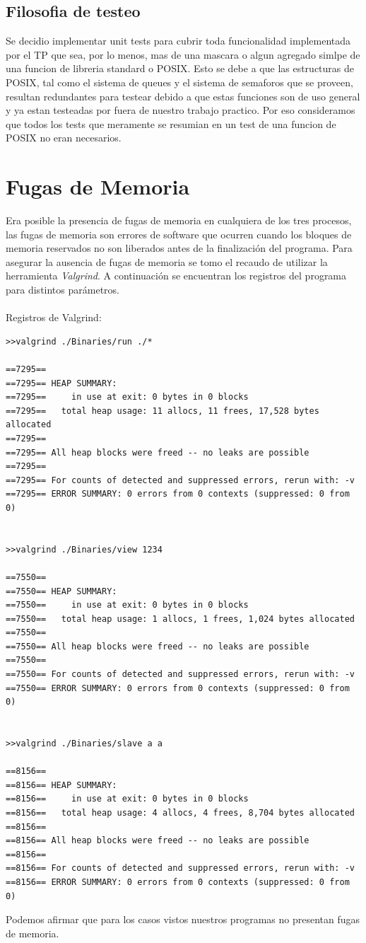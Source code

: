\documentclass[10pt,a4paper]{report}
\begin{document}
\subsection{Filosofia de testeo}
Se decidio implementar unit tests para cubrir toda funcionalidad implementada por el TP que sea, por lo menos, mas de una mascara o algun agregado simlpe de una funcion de libreria standard o POSIX. 
Esto se debe a que las estructuras de POSIX, tal como el sistema de queues y el sistema de semaforos que se proveen, resultan redundantes para testear debido a que estas funciones son de uso general y ya estan testeadas por fuera de nuestro trabajo practico. Por eso consideramos que todos los tests que meramente se resumian en un test de una funcion de POSIX no eran necesarios.

\section{Fugas de Memoria}
Era posible la presencia de fugas de memoria en cualquiera de los tres procesos, las fugas de memoria
son errores de software que ocurren cuando los bloques de memoria reservados no son liberados antes de la finalización del programa.
Para asegurar la ausencia de fugas de memoria se tomo el recaudo de utilizar la herramienta \textit{Valgrind}. A continuación se encuentran
los registros del programa para distintos parámetros.
\\\\ Registros de Valgrind:
\begin{lstlisting}
>>valgrind ./Binaries/run ./*

==7295==
==7295== HEAP SUMMARY:
==7295==     in use at exit: 0 bytes in 0 blocks
==7295==   total heap usage: 11 allocs, 11 frees, 17,528 bytes allocated
==7295==
==7295== All heap blocks were freed -- no leaks are possible
==7295==
==7295== For counts of detected and suppressed errors, rerun with: -v
==7295== ERROR SUMMARY: 0 errors from 0 contexts (suppressed: 0 from 0)


>>valgrind ./Binaries/view 1234

==7550==
==7550== HEAP SUMMARY:
==7550==     in use at exit: 0 bytes in 0 blocks
==7550==   total heap usage: 1 allocs, 1 frees, 1,024 bytes allocated
==7550==
==7550== All heap blocks were freed -- no leaks are possible
==7550==
==7550== For counts of detected and suppressed errors, rerun with: -v
==7550== ERROR SUMMARY: 0 errors from 0 contexts (suppressed: 0 from 0)


>>valgrind ./Binaries/slave a a

==8156==
==8156== HEAP SUMMARY:
==8156==     in use at exit: 0 bytes in 0 blocks
==8156==   total heap usage: 4 allocs, 4 frees, 8,704 bytes allocated
==8156==
==8156== All heap blocks were freed -- no leaks are possible
==8156==
==8156== For counts of detected and suppressed errors, rerun with: -v
==8156== ERROR SUMMARY: 0 errors from 0 contexts (suppressed: 0 from 0)

\end{lstlisting}
Podemos afirmar que para los casos vistos nuestros programas no presentan fugas de memoria.
\end{document}
